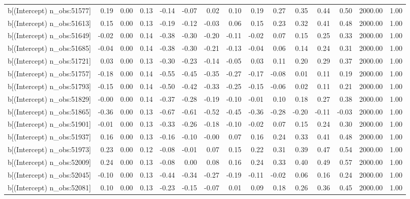 \begin{table}[ht]
\begin{tabular}{rrrrrrrrrrrrrrr}
  b[(Intercept) n\_obs:51577] & 0.19 & 0.00 & 0.13 & -0.14 & -0.07 & 0.02 & 0.10 & 0.19 & 0.27 & 0.35 & 0.44 & 0.50 & 2000.00 & 1.00 \\ 
  b[(Intercept) n\_obs:51613] & 0.15 & 0.00 & 0.13 & -0.19 & -0.12 & -0.03 & 0.06 & 0.15 & 0.23 & 0.32 & 0.41 & 0.48 & 2000.00 & 1.00 \\ 
  b[(Intercept) n\_obs:51649] & -0.02 & 0.00 & 0.14 & -0.38 & -0.30 & -0.20 & -0.11 & -0.02 & 0.07 & 0.15 & 0.25 & 0.33 & 2000.00 & 1.00 \\ 
  b[(Intercept) n\_obs:51685] & -0.04 & 0.00 & 0.14 & -0.38 & -0.30 & -0.21 & -0.13 & -0.04 & 0.06 & 0.14 & 0.24 & 0.31 & 2000.00 & 1.00 \\ 
  b[(Intercept) n\_obs:51721] & 0.03 & 0.00 & 0.13 & -0.30 & -0.23 & -0.14 & -0.05 & 0.03 & 0.11 & 0.20 & 0.29 & 0.37 & 2000.00 & 1.00 \\ 
  b[(Intercept) n\_obs:51757] & -0.18 & 0.00 & 0.14 & -0.55 & -0.45 & -0.35 & -0.27 & -0.17 & -0.08 & 0.01 & 0.11 & 0.19 & 2000.00 & 1.00 \\ 
  b[(Intercept) n\_obs:51793] & -0.15 & 0.00 & 0.14 & -0.50 & -0.42 & -0.33 & -0.25 & -0.15 & -0.06 & 0.02 & 0.11 & 0.21 & 2000.00 & 1.00 \\ 
  b[(Intercept) n\_obs:51829] & -0.00 & 0.00 & 0.14 & -0.37 & -0.28 & -0.19 & -0.10 & -0.01 & 0.10 & 0.18 & 0.27 & 0.38 & 2000.00 & 1.00 \\ 
  b[(Intercept) n\_obs:51865] & -0.36 & 0.00 & 0.13 & -0.67 & -0.61 & -0.52 & -0.45 & -0.36 & -0.28 & -0.20 & -0.11 & -0.03 & 2000.00 & 1.00 \\ 
  b[(Intercept) n\_obs:51901] & -0.01 & 0.00 & 0.13 & -0.33 & -0.26 & -0.18 & -0.10 & -0.02 & 0.07 & 0.15 & 0.24 & 0.30 & 2000.00 & 1.00 \\ 
  b[(Intercept) n\_obs:51937] & 0.16 & 0.00 & 0.13 & -0.16 & -0.10 & -0.00 & 0.07 & 0.16 & 0.24 & 0.33 & 0.41 & 0.48 & 2000.00 & 1.00 \\ 
  b[(Intercept) n\_obs:51973] & 0.23 & 0.00 & 0.12 & -0.08 & -0.01 & 0.07 & 0.15 & 0.22 & 0.31 & 0.39 & 0.47 & 0.54 & 2000.00 & 1.00 \\ 
  b[(Intercept) n\_obs:52009] & 0.24 & 0.00 & 0.13 & -0.08 & 0.00 & 0.08 & 0.16 & 0.24 & 0.33 & 0.40 & 0.49 & 0.57 & 2000.00 & 1.00 \\ 
  b[(Intercept) n\_obs:52045] & -0.10 & 0.00 & 0.13 & -0.44 & -0.34 & -0.27 & -0.19 & -0.11 & -0.02 & 0.06 & 0.16 & 0.24 & 2000.00 & 1.00 \\ 
  b[(Intercept) n\_obs:52081] & 0.10 & 0.00 & 0.13 & -0.23 & -0.15 & -0.07 & 0.01 & 0.09 & 0.18 & 0.26 & 0.36 & 0.45 & 2000.00 & 1.00 \\ 

\end{tabular}
\end{table}
